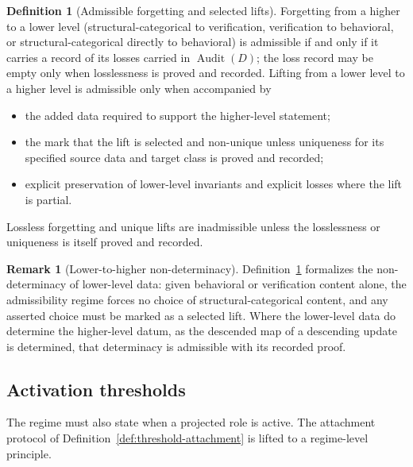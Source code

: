 \documentclass[11pt]{article}
\theoremstyle{definition}
\newtheorem{definition}[theorem]{Definition}
\newtheorem{remark}[theorem]{Remark}
\newcommand{\Audit}[1]{\ensuremath{\operatorname{Audit}\!\left(#1\right)}}
\begin{document}
\begin{definition}[Admissible forgetting and selected lifts]\label{prop:forgetting-lifts}
Forgetting from a higher to a lower level (structural-categorical to
verification, verification to behavioral, or structural-categorical directly to
behavioral) is admissible if and only if it carries a record of
its losses carried in \(\Audit{D}\); the loss record may be empty only when
losslessness is proved and recorded. Lifting from a lower level to a higher level is
admissible only when accompanied by
\begin{itemize}[topsep=2pt,itemsep=1pt]
  \item the added data required to support the higher-level statement;
  \item the mark that the lift is selected and non-unique unless uniqueness for its specified source data and target class is proved and recorded;
  \item explicit preservation of lower-level invariants and explicit
    losses where the lift is partial.
\end{itemize}
Lossless forgetting and unique lifts are inadmissible unless the losslessness
or uniqueness is itself proved and recorded.
\end{definition}

\begin{remark}[Lower-to-higher non-determinacy]\label{rem:lower-to-higher-non-determinacy}
Definition~\ref{prop:forgetting-lifts} formalizes the non-determinacy of
lower-level data: given behavioral or verification content alone, the admissibility regime
forces no choice of structural-categorical content, and any asserted choice
must be marked as a selected lift. Where the lower-level data do determine the
higher-level datum, as the descended map of a descending update is determined,
that determinacy is admissible with its recorded proof.
\end{remark}

\subsection{Activation thresholds}\label{subsec:activation-thresholds}

The regime must also state when a projected role is active. The
attachment protocol of Definition~\ref{def:threshold-attachment} is
lifted to a regime-level principle.
\end{document}
